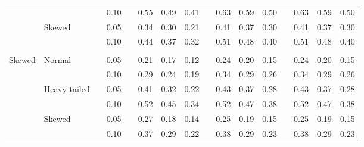 \documentclass[12pt]{article} %
\begin{document}
\begin{table}[ht]
\begin{scriptsize}
\begin{center}
\begin{tabular}{ll p{.1cm} c p{.1cm} rrr p{.1cm} rrr p{.1cm} rrr}
             &              && 0.10 &&   0.55 & 0.49 & 0.41 && 0.63 & 0.59 & 0.50 && 0.63 & 0.59 & 0.50 \\ 
             & Skewed       && 0.05 &&   0.34 & 0.30 & 0.21 && 0.41 & 0.37 & 0.30 && 0.41 & 0.37 & 0.30 \\ 
             &              && 0.10 &&   0.44 & 0.37 & 0.32 && 0.51 & 0.48 & 0.40 && 0.51 & 0.48 & 0.40 \\ 
             &&&&&&&&&&&&&&&\\
Skewed       & Normal       && 0.05 &&   0.21 & 0.17 & 0.12 && 0.24 & 0.20 & 0.15 && 0.24 & 0.20 & 0.15 \\ 
             &              && 0.10 &&   0.29 & 0.24 & 0.19 && 0.34 & 0.29 & 0.26 && 0.34 & 0.29 & 0.26 \\ 
             & Heavy tailed && 0.05 &&   0.41 & 0.32 & 0.22 && 0.43 & 0.37 & 0.28 && 0.43 & 0.37 & 0.28 \\ 
             &              && 0.10 &&   0.52 & 0.45 & 0.34 && 0.52 & 0.47 & 0.38 && 0.52 & 0.47 & 0.38 \\ 
             & Skewed       && 0.05 &&   0.27 & 0.18 & 0.14 && 0.25 & 0.19 & 0.15 && 0.25 & 0.19 & 0.15 \\ 
             &              && 0.10 &&   0.37 & 0.29 & 0.22 && 0.38 & 0.29 & 0.23 && 0.38 & 0.29 & 0.23 \\ 




\end{tabular}
\end{center}
\end{scriptsize}
\end{table}
\end{document}
